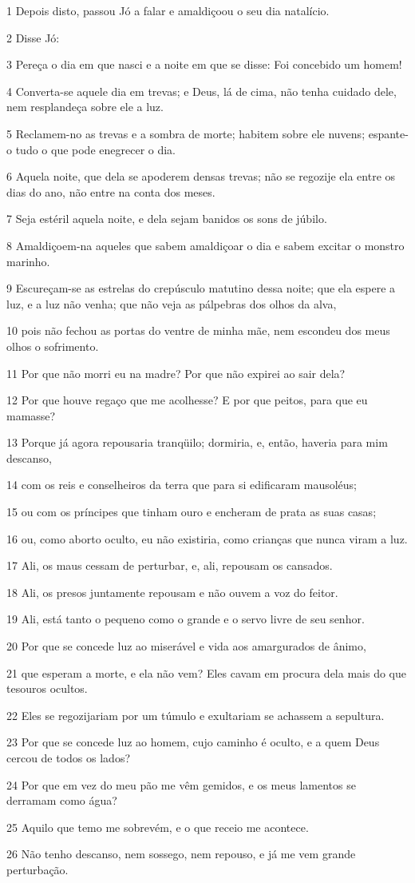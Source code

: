 \par 1 Depois disto, passou Jó a falar e amaldiçoou o seu dia natalício.
\par 2 Disse Jó:
\par 3 Pereça o dia em que nasci e a noite em que se disse: Foi concebido um homem!
\par 4 Converta-se aquele dia em trevas; e Deus, lá de cima, não tenha cuidado dele, nem resplandeça sobre ele a luz.
\par 5 Reclamem-no as trevas e a sombra de morte; habitem sobre ele nuvens; espante-o tudo o que pode enegrecer o dia.
\par 6 Aquela noite, que dela se apoderem densas trevas; não se regozije ela entre os dias do ano, não entre na conta dos meses.
\par 7 Seja estéril aquela noite, e dela sejam banidos os sons de júbilo.
\par 8 Amaldiçoem-na aqueles que sabem amaldiçoar o dia e sabem excitar o monstro marinho.
\par 9 Escureçam-se as estrelas do crepúsculo matutino dessa noite; que ela espere a luz, e a luz não venha; que não veja as pálpebras dos olhos da alva,
\par 10 pois não fechou as portas do ventre de minha mãe, nem escondeu dos meus olhos o sofrimento.
\par 11 Por que não morri eu na madre? Por que não expirei ao sair dela?
\par 12 Por que houve regaço que me acolhesse? E por que peitos, para que eu mamasse?
\par 13 Porque já agora repousaria tranqüilo; dormiria, e, então, haveria para mim descanso,
\par 14 com os reis e conselheiros da terra que para si edificaram mausoléus;
\par 15 ou com os príncipes que tinham ouro e encheram de prata as suas casas;
\par 16 ou, como aborto oculto, eu não existiria, como crianças que nunca viram a luz.
\par 17 Ali, os maus cessam de perturbar, e, ali, repousam os cansados.
\par 18 Ali, os presos juntamente repousam e não ouvem a voz do feitor.
\par 19 Ali, está tanto o pequeno como o grande e o servo livre de seu senhor.
\par 20 Por que se concede luz ao miserável e vida aos amargurados de ânimo,
\par 21 que esperam a morte, e ela não vem? Eles cavam em procura dela mais do que tesouros ocultos.
\par 22 Eles se regozijariam por um túmulo e exultariam se achassem a sepultura.
\par 23 Por que se concede luz ao homem, cujo caminho é oculto, e a quem Deus cercou de todos os lados?
\par 24 Por que em vez do meu pão me vêm gemidos, e os meus lamentos se derramam como água?
\par 25 Aquilo que temo me sobrevém, e o que receio me acontece.
\par 26 Não tenho descanso, nem sossego, nem repouso, e já me vem grande perturbação.

